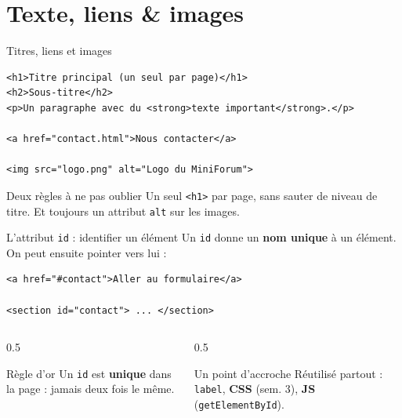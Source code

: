 \documentclass[aspectratio=169,11pt]{beamer}
\begin{document}
\section{Texte, liens \& images}
{
\begin{frame}[plain]
\end{frame}
}

\begin{frame}[fragile]{Titres, liens et images}
\begin{lstlisting}[language=HTML5]
<h1>Titre principal (un seul par page)</h1>
<h2>Sous-titre</h2>
<p>Un paragraphe avec du <strong>texte important</strong>.</p>

<a href="contact.html">Nous contacter</a>

<img src="logo.png" alt="Logo du MiniForum">
\end{lstlisting}
  \begin{alertblock}{Deux règles à ne pas oublier}
    Un seul \texttt{<h1>} par page, sans sauter de niveau de titre. Et toujours un attribut \texttt{alt} sur les images.
  \end{alertblock}
\end{frame}

\begin{frame}[fragile]{L'attribut \texttt{id} : identifier un élément}
  Un \texttt{id} donne un \textbf{nom unique} à un élément. On peut ensuite pointer vers lui :
\begin{lstlisting}[language=HTML5]
<a href="#contact">Aller au formulaire</a>

<section id="contact"> ... </section>
\end{lstlisting}
  \vspace{0.1cm}
  \begin{columns}[T]
    \begin{column}{0.5\textwidth}
      \begin{alertblock}{Règle d'or}
        Un \texttt{id} est \textbf{unique} dans la page : jamais deux fois le même.
      \end{alertblock}
    \end{column}
    \begin{column}{0.5\textwidth}
      \begin{block}{Un point d'accroche}
        Réutilisé partout : \texttt{label}, \textbf{CSS} (sem. 3), \textbf{JS} (\texttt{getElementById}).
      \end{block}
    \end{column}
  \end{columns}
\end{frame}
\end{document}
